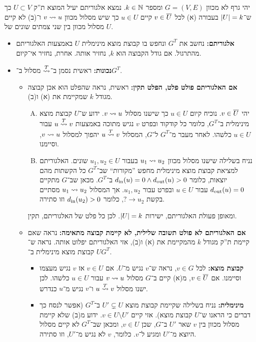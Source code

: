 \documentclass[]{../../../../tex/classes/homework}
\newcommand\squigT{\overset{T}{\squig}}
\begin{document}
	\npage
	\section{}
	יהי גרף לא מכוון $G = (V, E)$ ומספר $k \in \mathbb{N}$. נמצא אלגוריתם יעיל המוצא ת''ק $U \subset V$ כך ש־$\left \lvert U \right \rvert = k$ בעבורה (א) לכל $v \in \overline U$ קיים $u \in U$ כך שיש מסלול מכוון $v \rightsquigarrow u$ ו־(ב) לא קיים מסלול מכוון בין שני צמתים שונים של $U$. 
	\begin{itemize}
		\item \textbf{אלגוריתם: }נחשב את $G^{T}$ ונחפש בו קבוצת מוצא מינימלית $U$ באמצעות האלגוריתם מהתרגול. אם גודל הקבוצה הוא $k$, נחזיר אותה. אחרת, נחזיר אי־קיום. 
		\item \textbf{נכונות: }ראשית נסמן ב־$\squigT$ מסלול ב־$G^{T}$. 
		\begin{itemize}
			\item \textbf{אם האלגוריתם פולט פלט, הפלט תקין: }ראשית, נראה שהפלט הוא אכן קבוצה מגודל $k$ שמקיימת את (א) ו(ב). 
			\begin{enumerate}[(A)]
				\item יהי $v \in \overline U$. נוכיח קיום $u \in U$ כך שישנו מסלול $v\rightsquigarrow u$. ידוע ש־$U$ קבוצת מוצא מינימלית ב־$G^{T}$, כלומר כל קודקוד ובפרט $v$ נגיש מתוכה באמצעות $u \squigT v$ עבור $u \in U$ כלשהו. לאחר מעבר מ־$G^{T}$ ל־$G$, המסלול $u \squigT v$ יהפוך למסלול $v \rightsquigarrow u$, וסיימנו. 
				\item נניח בשלילה שישנו מסלול מכוון $u_1 \rightsquigarrow u_2$ בעבור $u_1, u_2 \in U$ שונים. האלגוריתם למציאת קבוצת מוצא מינימלית מחפש ''מקורות`` שב־$G^{T}$ כל הקשתות מהם יוצאות, כלומר $d_{\mathrm{in}}(u) = 0 \land d_{\mathrm{out}}(u) > 0$ ב־$G^{T}$. מכאן שב־$G$ מתקיים $d_{\mathrm{out}}(u) = 0$ עבור $u \in U$ ובפרט עבור $u_1, u_2$. אך המסלול $u_1 \rightsquigarrow u_2$ מסתיים בקשת $? \to u_2$, כלומר $d_{\mathrm{in}}(u_2) > 0$ וזו סתירה. 
			\end{enumerate}
			ומאופן פעולת האלגוריתם, ישירות $\left \lvert U \right \rvert = k$. לכן כל פלט של האלגוריתם, תקין. 
			\item \textbf{אם האלגוריתם לא פולט תשובה שלילית, לא קיימת קבוצה מתאימה: }נראה שאם קיימת ת''ק מגודל $k$ מהמקיימת את (א) ו(ב), אזי האלגוריתם יפלוט אותה. נראה ש־$U$ קבוצת מוצא מינימלית ב־$G^{T}$. 
			\begin{itemize}[*]
				\item \textbf{קבוצת מוצא: }לכל $v \in G$, נראה ש־$v$ נגיש מ־$U$. אם $v \in U$ אז $v$ נגיש מעצמו וסיימנו. אם $v \in \overline U$, מ(א) קיים ב־$G$ מסלול $v \rightsquigarrow u$ עבור $u \in U$ כלשהו. לכן ישנו מסלול $u \squigT v$ ו־$v$ נגיש מ־$u$ כנדרש. 
				\item \textbf{מינימלית: }נניח בשלילה שקיימת קבוצת מוצא $U' \subsetneq U$ ב־$G^{T}$ (אפשר לנסח כך דברים כי הראנו ש־$U$ קבוצת מוצא). אזי קיים $v \in U \setminus U'$. ידוע מ(ב) שלא קיימת מסלול מכוון בין $v$ שאר $U'$ ב־$G$, שכן $v \in U$, ומכאן שב־$G^{T}$ לא קיים מסלול היוצא מ־$U'$ ומגיע ל־$v$. כלומר, $v$ לא נגיש מ־$U'$, וזו סתירה. 

\end{itemize}
\end{itemize}
\end{itemize}
\end{document}
